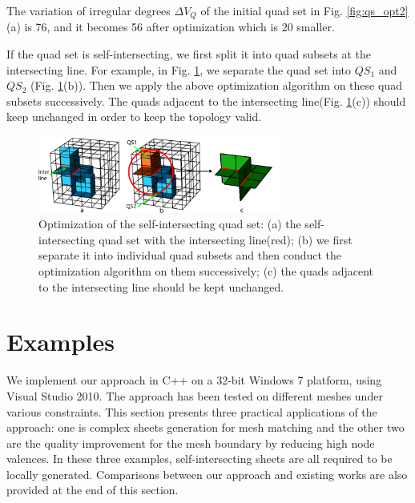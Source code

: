 \documentclass[final,5p,times,twocolumn]{elsarticle}
\begin{document}
The variation of irregular degrees $\Delta V_Q$ of the initial quad set in Fig. \ref{fig:qs_opt2}(a) is 76, and it becomes 56 after optimization which is 20 smaller.

If the quad set is self-intersecting, we first split it into quad subsets at the intersecting line. For example, in Fig. \ref{fig:opt_int_quad_sets}, we separate the quad set into $QS_1$ and $QS_2$ (Fig. \ref{fig:opt_int_quad_sets}(b)). Then we apply the above optimization algorithm on these quad subsets successively. The quads adjacent to the intersecting line(Fig. \ref{fig:opt_int_quad_sets}(c)) should keep unchanged in order to keep the topology valid.

\begin{figure}[htbp]
\begin{center}
\includegraphics[width=8cm]{opt_int_quad_sets.png}
\caption{Optimization of the self-intersecting quad set: (a) the self-intersecting quad set with the intersecting line(red); (b) we first separate it into individual quad subsets and then conduct the optimization algorithm on them successively; (c) the quads adjacent to the intersecting line should be kept unchanged.}
\label{fig:opt_int_quad_sets}
\end{center}
\end{figure}

\section{Examples}
\label{sec:examples}
We implement our approach in C++ on a 32-bit Windows 7 platform, using Visual Studio 2010. The approach has been tested on different meshes under various constraints. This section presents three practical applications of the approach: one is complex sheets generation for mesh matching and the other two are the quality improvement for the mesh boundary by reducing high node valences. In these three examples, self-intersecting sheets are all required to be locally generated. Comparisons between our approach and existing works are also provided at the end of this section.

\end{document}

